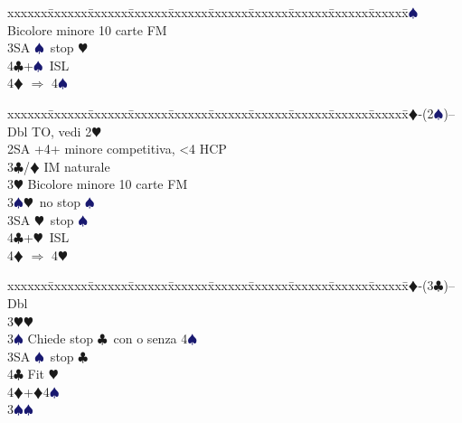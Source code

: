 \documentclass[a4paper,italian]{article}
\newcommand{\BC}{\textcolor{OliveGreen}{$\clubsuit$}}
\newcommand{\BD}{\textcolor{RedOrange}{$\vardiamondsuit$}}
\newcommand{\BH}{\textcolor{Red2}{$\varheartsuit${}}}
\newcommand{\BS}{\textcolor{MidnightBlue}{$\spadesuit${}}}
\newenvironment{bidtable}
{\begin{tabbing}

    xxxxxx\=xxxxxx\=xxxxxx\=xxxxxx\=xxxxxx\=xxxxxx\=xxxxxx\=xxxxxx\=xxxxxx\=xxxxxx\=\kill}
{\end{tabbing} }%
\begin{document}
\begin{multicols}{2}
\begin{bidtable}
                                            3\BS \> Bicolore minore 10 carte FM\\
                                            3SA \BS\ stop \BH \\
                                            4\BC {}+\BS\ ISL\\
                                            4\BD \> $\Rightarrow$ 4\BS \-
                                        \end{bidtable}
                                        \begin{bidtable}
                                            2\BD-(2\BS)--\+\\
                                            Dbl \> TO, vedi 2\BH \\
                                            2SA +4+ minore competitiva, <4 HCP\\
                                            3\BC/\BD \> IM naturale\\
                                            3\BH \> Bicolore minore 10 carte FM\\
                                            3\BS {}\BH\ no stop \BS \\
                                            3SA \BH\ stop \BS \\
                                            4\BC {}+\BH\ ISL\\
                                            4\BD \> $\Rightarrow$ 4\BH \-
                                        \end{bidtable}
                                        \begin{bidtable}
                                            2\BD-(3\BC)--\+\\
                                            Dbl\+\\
                                            3\BH {}\BH \+\\
                                            3\BS \> Chiede stop \BC\ con o senza 4\BS \\
                                            3SA \BS\ stop \BC\\
                                            4\BC \> Fit \BH \\
                                            4\BD {}+\BD 4\BS \-\\
                                            3\BS {}\BS \+\\

\end{bidtable}
\end{multicols}
\end{document}
